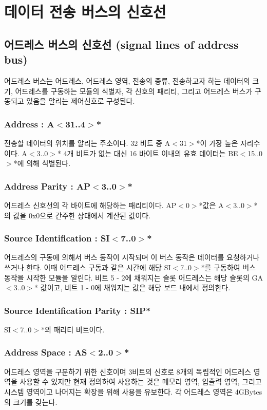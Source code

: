 %
%
\section{데이터 전송 버스의 신호선}

\subsection{어드레스 버스의 신호선 (signal lines of address bus)}
어드레스 버스는 어드레스, 어드레스 영역, 전송의 종류, 전송하고자 하는 데이터의 크기, 어드레스를
구동하는 모듈의 식별자, 각 신호의 패리티, 그리고 어드레스 버스가 구동되고 있음을 알리는 제어신호로
구성된다.
%
\subsubsection{Address : A$<$31..4$>$*}
전송할 데이터의 위치를 알리는 주소이다. 32 비트 중 A$<$31$>$*이
가장 높은 자리수이다.
A$<$3..0$>$* 4개 비트가 없는 대신
16 바이트 이내의 유효 데이터는 BE$<$15..0$>$*에 의해
식별된다.
%
\subsubsection{Address Parity : AP$<$3..0$>$*}
어드레스 신호선의 각 바이트에 해당하는 패리티이다.
AP$<$0$>$*값은 A$<$3..0$>$*의 값을
0x0으로 간주한 상태에서 계산된 값이다.

%
\subsubsection{Source Identification : SI$<$7..0$>$*}
어드레스의 구동에 의해서 버스 동작이 시작되며 이 버스 동작은 데이터를 요청하거나 쓰거나 한다.
이때 어드레스 구동과 같은 시간에 해당 SI$<$7..0$>$*를 구동하여 버스 동작을 시작한 모듈을
알린다. 비트 5 - 2에 채워지는 슬롯 어드레스는 해당 슬롯의 GA$<$3..0$>$* 값이고,
비트 1 - 0에 채워지는 값은 해당 보드 내에서 정의한다.

%
\subsubsection{Source Identification Parity : SIP*}
SI$<$7..0$>$*의 패리티 비트이다.
%
\subsubsection{Address Space : AS$<$2..0$>$*}
어드레스 영역을 구분하기 위한 신호이며 3비트의 신호로 8개의 독립적인 어드레스 영역을 사용할 수 있지만
현재 정의하여 사용하는 것은 메모리 영역, 입출력 영역, 그리고 시스템 영역이고 나머지는 확장을 위해 사용을 유보한다.
각 어드레스 영역은 4GBytes의 크기를 갖는다.

%
